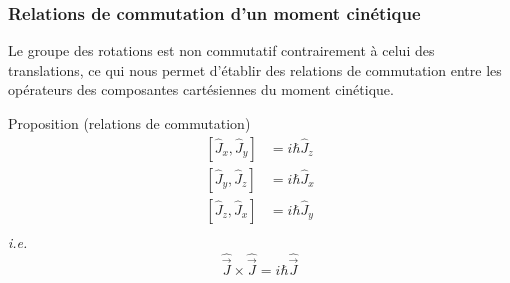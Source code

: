         \subsubsection{Relations de commutation d’un moment cinétique}

        Le groupe des rotations est non commutatif contrairement à celui des translations, ce qui nous permet d’établir des relations de commutation entre les opérateurs des composantes cartésiennes du moment cinétique.

\begin{omed}{Proposition (relations de commutation)}
    \begin{align*}
        \left[\hat{J}_x, \hat{J}_y\right] & = i \hbar \hat{J}_z \\
        \left[\hat{J}_y, \hat{J}_z\right] & = i \hbar \hat{J}_x \\
        \left[\hat{J}_z, \hat{J}_x\right] & = i \hbar \hat{J}_y \\
    \end{align*}
    \textit{i.e.}
    \[ \hat{\vec{J}} \times \hat{\vec{J}} = i \hbar \hat{\vec{J}} \]
\end{omed}

